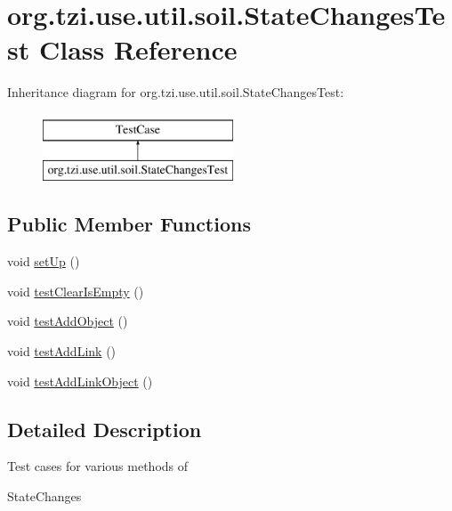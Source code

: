 \hypertarget{classorg_1_1tzi_1_1use_1_1util_1_1soil_1_1_state_changes_test}{\section{org.\-tzi.\-use.\-util.\-soil.\-State\-Changes\-Test Class Reference}
\label{classorg_1_1tzi_1_1use_1_1util_1_1soil_1_1_state_changes_test}
}
Inheritance diagram for org.\-tzi.\-use.\-util.\-soil.\-State\-Changes\-Test\-:\begin{figure}[H]
\begin{center}
\leavevmode
\includegraphics[height=2.000000cm]{classorg_1_1tzi_1_1use_1_1util_1_1soil_1_1_state_changes_test}
\end{center}
\end{figure}
\subsection*{Public Member Functions}
\begin{DoxyCompactItemize}
\item 
void \hyperlink{classorg_1_1tzi_1_1use_1_1util_1_1soil_1_1_state_changes_test_ab4ac32f1ab078dce0068f887bd79cb88}{set\-Up} ()
\item 
void \hyperlink{classorg_1_1tzi_1_1use_1_1util_1_1soil_1_1_state_changes_test_a65bb9b9094c9d999887040c33c98ea46}{test\-Clear\-Is\-Empty} ()
\item 
void \hyperlink{classorg_1_1tzi_1_1use_1_1util_1_1soil_1_1_state_changes_test_abd4bb3193c1a21de5e2ad53a3031df96}{test\-Add\-Object} ()
\item 
void \hyperlink{classorg_1_1tzi_1_1use_1_1util_1_1soil_1_1_state_changes_test_a1b1ecfee9bcde1e53c03f003c0320d21}{test\-Add\-Link} ()
\item 
void \hyperlink{classorg_1_1tzi_1_1use_1_1util_1_1soil_1_1_state_changes_test_a0f579f0944cf94aa4a8eac7e2ce7b027}{test\-Add\-Link\-Object} ()
\end{DoxyCompactItemize}


\subsection{Detailed Description}
Test cases for various methods of
\begin{DoxyCode}
StateChanges 
\end{DoxyCode}


